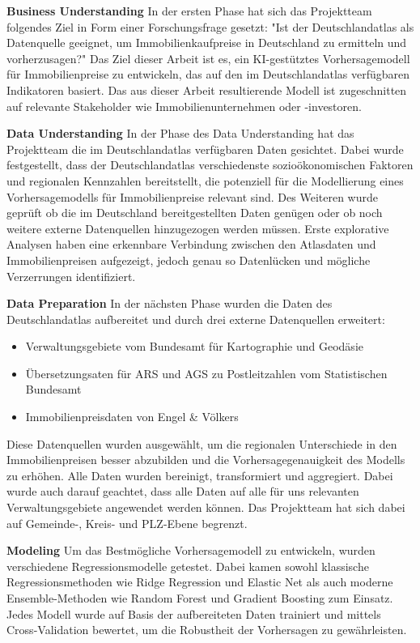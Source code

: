 \textbf{Business Understanding}
In der ersten Phase hat sich das Projektteam folgendes Ziel in Form einer Forschungsfrage gesetzt: "Ist der Deutschlandatlas als Datenquelle geeignet, um Immobilienkaufpreise in Deutschland zu ermitteln und vorherzusagen?"
Das Ziel dieser Arbeit ist es, ein KI-gestütztes Vorhersagemodell für Immobilienpreise zu entwickeln, das auf den im Deutschlandatlas verfügbaren Indikatoren basiert. Das aus dieser Arbeit resultierende Modell ist zugeschnitten auf relevante Stakeholder wie Immobilienunternehmen oder -investoren.

\textbf{Data Understanding}
In der Phase des Data Understanding hat das Projektteam die im Deutschlandatlas verfügbaren Daten gesichtet. Dabei wurde festgestellt, dass der Deutschlandatlas verschiedenste sozioökonomischen Faktoren und regionalen Kennzahlen bereitstellt, die potenziell für die Modellierung eines Vorhersagemodells für Immobilienpreise relevant sind. Des Weiteren wurde geprüft ob die im Deutschland bereitgestellten Daten genügen oder ob noch weitere externe Datenquellen hinzugezogen werden müssen. Erste explorative Analysen haben eine erkennbare Verbindung zwischen den Atlasdaten und Immobilienpreisen aufgezeigt, jedoch genau so Datenlücken und mögliche Verzerrungen identifiziert.

\textbf{Data Preparation}
In der nächsten Phase wurden die Daten des Deutschlandatlas aufbereitet und durch drei externe Datenquellen erweitert:
\begin{itemize}
    \item Verwaltungsgebiete vom Bundesamt für Kartographie und Geodäsie
    \item Übersetzungsaten für ARS und AGS zu Postleitzahlen vom Statistischen Bundesamt
    \item Immobilienpreisdaten von Engel & Völkers
\end{itemize}
Diese Datenquellen wurden ausgewählt, um die regionalen Unterschiede in den Immobilienpreisen besser abzubilden und die Vorhersagegenauigkeit des Modells zu erhöhen. Alle Daten wurden bereinigt, transformiert und aggregiert. Dabei wurde auch darauf geachtet, dass alle Daten auf alle für uns relevanten Verwaltungsgebiete angewendet werden können. Das Projektteam hat sich dabei auf Gemeinde-, Kreis- und PLZ-Ebene begrenzt.


\textbf{Modeling}
Um das Bestmögliche Vorhersagemodell zu entwickeln, wurden verschiedene Regressionsmodelle getestet. Dabei kamen sowohl klassische Regressionsmethoden wie Ridge Regression und Elastic Net als auch moderne Ensemble-Methoden wie Random Forest und Gradient Boosting zum Einsatz. Jedes Modell wurde auf Basis der aufbereiteten Daten trainiert und mittels Cross-Validation bewertet, um die Robustheit der Vorhersagen zu gewährleisten.

